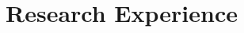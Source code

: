 \documentclass[10pt,letterpaper,sans]{moderncv}        %
\newcommand\x{1}
\newcommand\y{4}
\begin{document}


%



\vspace{-0.25 cm}
\section{Research Experience}
\vspace{-3 pt}

\vspace{\y pt}



\end{document}
